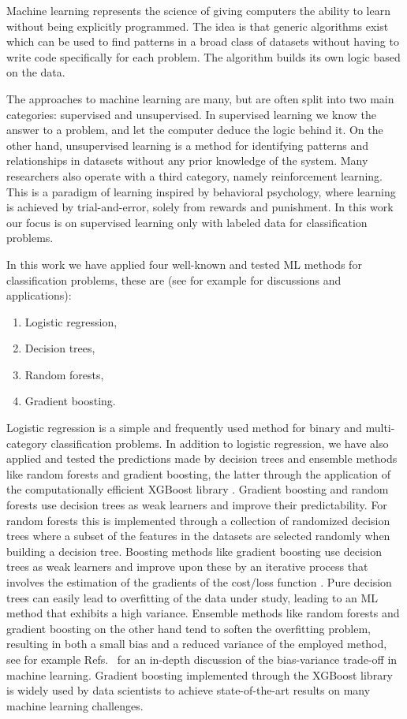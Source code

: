 \documentclass[superscriptaddress,unsortedaddress,
 amsmath,amssymb,
 aps,
]{revtex4-2}
\begin{document}
Machine learning represents the science of giving computers the ability to learn without being explicitly programmed. The idea is that generic algorithms exist which can be used to find patterns in a broad class of datasets without having to write code specifically for each problem. The algorithm builds its own logic based on the data. 

The approaches to machine learning are many, but are often split into two main categories: supervised and unsupervised. In supervised learning we know the answer to a problem, and let the computer deduce the logic behind it. On the other hand, unsupervised learning is a method for identifying patterns and relationships in datasets without any prior knowledge of the system. Many researchers also operate with a third category, namely reinforcement learning. This is a paradigm of learning inspired by behavioral psychology, where learning is achieved by trial-and-error, solely from rewards and punishment. In this work our focus is on supervised learning only with labeled data for classification problems.

In this work we have applied four well-known and tested ML methods for classification problems, these are (see for example \cite{Hastie2009,Mehta2019} for discussions and applications):
\begin{enumerate}
    \item Logistic regression,
    \item Decision trees,
    \item Random forests,
    \item Gradient boosting.
\end{enumerate}
Logistic regression \cite{Hastie2009} is a simple and frequently used method for binary and multi-category classification problems. In addition to logistic regression, we have also applied and tested the predictions made by decision trees and ensemble methods like random forests and gradient boosting, the latter through the application of the computationally efficient XGBoost library \cite{xgboost2016}. Gradient boosting and random forests use decision trees as weak learners and improve their predictability. For random forests this is implemented through a collection of randomized decision trees where a subset of the features in the datasets are selected randomly when building a decision tree. Boosting methods like gradient boosting use decision trees as weak learners and improve upon these by an iterative process that involves the estimation of the gradients of the cost/loss function  \cite{Hastie2009}. Pure decision trees can easily lead to overfitting of the data under study, leading to an ML method that exhibits a high variance. Ensemble methods like random forests and gradient boosting on the other hand tend to soften the overfitting problem, resulting in both a small bias and a reduced variance of the employed method, see for example Refs.~\cite{Hastie2009,Mehta2019} for an in-depth discussion of the bias-variance trade-off in machine learning. Gradient boosting implemented through the  XGBoost library \cite{xgboost2016} is widely used by data scientists to achieve state-of-the-art results on many machine learning challenges. 
\end{document}
